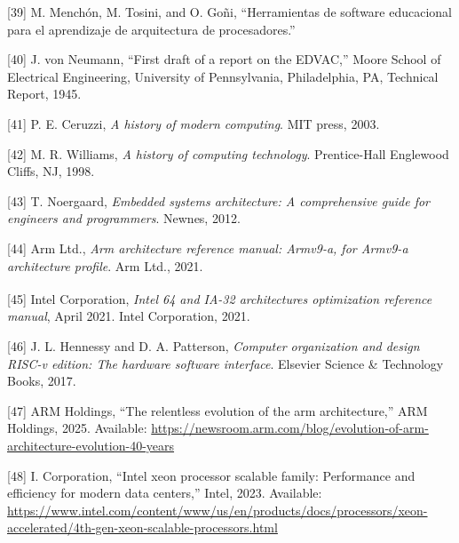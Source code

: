 \documentclass[12pt,oneside]{templates/unerthesis}
\newcommand{\CSLLeftMargin}[1]{#1} %
\newcommand{\CSLRightInline}[1]{#1} %
\newlength{\cslhangindent}
\newenvironment{CSLReferences}[2] %
 {\setlength{\parindent}{0pt}%
  \setlength{\leftskip}{#1 pt\relax}%
  \setlength{\parskip}{#2 pt\relax}%
  \everypar{\setlength{\hangindent}{\cslhangindent}}}
 {\par}
\begin{document}
\begin{CSLReferences}{0}{0}
\leavevmode{}%
\CSLLeftMargin{{[}39{]} }%
\CSLRightInline{M. Menchón, M. Tosini, and O. Goñi, {``Herramientas de software educacional para el aprendizaje de arquitectura de procesadores.''}}

\leavevmode{}%
\CSLLeftMargin{{[}40{]} }%
\CSLRightInline{J. von Neumann, {``First draft of a report on the {EDVAC},''} Moore School of Electrical Engineering, University of Pennsylvania, Philadelphia, PA, Technical Report, 1945.}

\leavevmode{}%
\CSLLeftMargin{{[}41{]} }%
\CSLRightInline{P. E. Ceruzzi, \emph{A history of modern computing}. MIT press, 2003.}

\leavevmode{}%
\CSLLeftMargin{{[}42{]} }%
\CSLRightInline{M. R. Williams, \emph{A history of computing technology}. Prentice-Hall Englewood Cliffs, NJ, 1998.}

\leavevmode{}%
\CSLLeftMargin{{[}43{]} }%
\CSLRightInline{T. Noergaard, \emph{Embedded systems architecture: A comprehensive guide for engineers and programmers}. Newnes, 2012.}

\leavevmode{}%
\CSLLeftMargin{{[}44{]} }%
\CSLRightInline{Arm Ltd., \emph{Arm architecture reference manual: Armv9-a, for Armv9-a architecture profile}. Arm Ltd., 2021.}

\leavevmode{}%
\CSLLeftMargin{{[}45{]} }%
\CSLRightInline{Intel Corporation, \emph{Intel\textsuperscript{\textregistered} 64 and IA-32 architectures optimization reference manual}, April 2021. Intel Corporation, 2021.}

\leavevmode{}%
\CSLLeftMargin{{[}46{]} }%
\CSLRightInline{J. L. Hennessy and D. A. Patterson, \emph{Computer organization and design RISC-v edition: The hardware software interface}. Elsevier Science \& Technology Books, 2017.}

\leavevmode{}%
\CSLLeftMargin{{[}47{]} }%
\CSLRightInline{ARM Holdings, {``The relentless evolution of the arm architecture,''} ARM Holdings, 2025. Available: \url{https://newsroom.arm.com/blog/evolution-of-arm-architecture-evolution-40-years}}

\leavevmode{}%
\CSLLeftMargin{{[}48{]} }%
\CSLRightInline{I. Corporation, {``Intel xeon processor scalable family: Performance and efficiency for modern data centers,''} Intel, 2023. Available: \url{https://www.intel.com/content/www/us/en/products/docs/processors/xeon-accelerated/4th-gen-xeon-scalable-processors.html}}


\end{CSLReferences}
\end{document}
